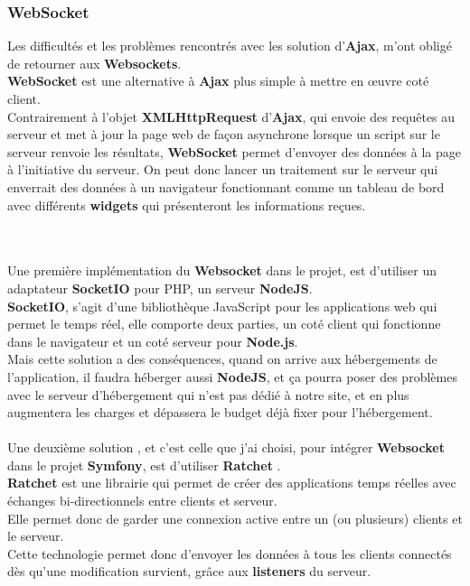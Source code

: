 \documentclass[12pt]{article}
\begin{document}
\subsubsection{WebSocket}
Les difficultés et les problèmes rencontrés avec les solution d'\textbf{Ajax}, m'ont obligé de retourner aux \textbf{Websockets}.\\
\textbf{WebSocket} est une alternative à \textbf{Ajax} plus simple à mettre en œuvre coté client.\\
Contrairement à l'objet \textbf{XMLHttpRequest} d'\textbf{Ajax}, qui envoie des requêtes au serveur et met à jour la page web de façon asynchrone lorsque un script sur le serveur renvoie les résultats, \textbf{WebSocket} permet d'envoyer des données à la page à l'initiative du serveur. On peut donc lancer un traitement sur le serveur qui enverrait des données à un navigateur fonctionnant comme un tableau de bord avec différents \textbf{widgets} qui présenteront les informations reçues.

\\
 \\
Une première implémentation  du \textbf{Websocket} dans le projet, 
est d'utiliser  un adaptateur \textbf{SocketIO} pour PHP, un serveur  \textbf{NodeJS}.\\ 
\textbf{SocketIO},  s’agit d’une bibliothèque JavaScript pour les applications web qui permet le temps réel, elle comporte deux parties, un coté client qui fonctionne dans le navigateur et un coté serveur pour \textbf{Node.js}.\\
Mais cette solution a des conséquences,  quand on arrive aux 
hébergements de l'application, il faudra héberger aussi \textbf{NodeJS}, et ça pourra poser des problèmes avec le serveur d’hébergement qui n'est pas dédié à notre site, et en plus augmentera les charges et dépassera le budget déjà fixer pour l'hébergement.\\ \\


Une deuxième solution , et c'est celle que j'ai choisi, pour intégrer \textbf{Websocket}  dans 
le projet \textbf{Symfony}, est d'utiliser \textbf{Ratchet} .\\
\textbf{Ratchet} est une librairie qui permet de créer des applications temps réelles avec échanges bi-directionnels entre clients et serveur.\\

Elle permet donc de garder une connexion active entre un (ou plusieurs) clients et le serveur. \\
 Cette technologie permet donc d'envoyer les données à tous les clients connectés dès qu'une modification survient, grâce aux \textbf{listeners} du serveur.\\ \\
\end{document}
